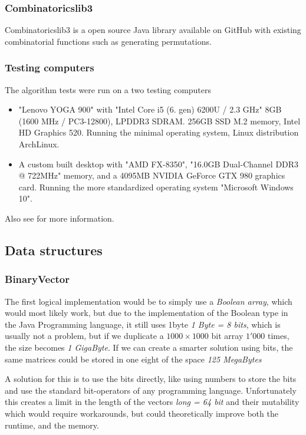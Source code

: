 \documentclass[a4paper]{article}
\begin{document}
\subsubsection{Combinatoricslib3}
Combinatoricslib3 is a open source Java library available on GitHub with existing
combinatorial functions such as generating permutations.

\subsubsection{Testing computers}
\label{sec:computer}
The algorithm tests were run on a two testing computers
\begin{itemize}
    \item "Lenovo YOGA 900" with "Intel Core i5 (6. gen) 6200U / 2.3 GHz"
          8GB (1600 MHz / PC3-12800), LPDDR3 SDRAM. 256GB SSD M.2 memory, Intel HD Graphics 520.
          Running the minimal operating system, Linux distribution ArchLinux.
    \item A custom built desktop with "AMD FX-8350", "16.0GB Dual-Channel DDR3 @ 722MHz" memory, and a
          4095MB NVIDIA GeForce GTX 980 graphics card. Running the more standardized operating
          system "Microsoft Windows 10".
\end{itemize}

Also see  for more information.

\subsection{Data structures}
\subsubsection{BinaryVector}
The first logical implementation would be to simply use a \textit{Boolean array}, which would
most likely work, but due to the implementation of the Boolean type in the Java Programming language,
it still uses 1byte \textit{1 Byte = 8 bits}, which is usually not a problem, but if we duplicate
a $1000 \times 1000$ bit array $1'000$ times, the size becomes \textit{1 GigaByte}. If we can create
a smarter solution using bits, the same matrices could be stored in one eight of the space
\textit{125 MegaBytes}

A solution for this is to use the bits directly, like using numbers to store the bits and use the standard
bit-operators of any programming language. Unfortunately this creates a limit in the length
of the vectors \textit{long = 64 bit} and their mutability which would require workarounds,
but could theoretically improve both the runtime, and the memory.
\end{document}
